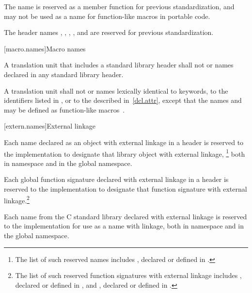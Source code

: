 \pnum
The name   is reserved as a
member function for previous standardization, and may not be used as a name for
function-like macros in portable code.

\pnum
The header names , , ,
, and  are reserved for previous standardization.

[macro.names]{Macro names}

\pnum
{}%
%
A translation unit that includes a standard library header shall not
 or  names declared in any standard
library header.

\pnum
{}%
A translation unit shall not  or 
names lexically identical
to keywords,
to the identifiers listed in , or
to the  described in~\ref{dcl.attr},
except that the names  and  may be
defined as function-like macros~.

[extern.names]{External linkage}

\pnum
Each name declared as an object with external linkage
%
in a header is reserved to the implementation to designate that library
object with external linkage,%
\footnote{The list of such reserved names includes
,
declared or defined in
%
.}
both in namespace
and in the global namespace.

\pnum
Each
%
global function signature declared with
%
external linkage in a header is reserved to the
implementation to designate that function signature with
%
external linkage.\footnote{The list of such reserved function
signatures with external linkage includes
%
,
declared or defined in
%
,
and
%
%
,
declared or defined in
%
.}

\pnum
Each name from the C standard library declared with external linkage
%
is reserved to the implementation for use as a name with
%
%
linkage,
both in namespace  and in the global namespace.

